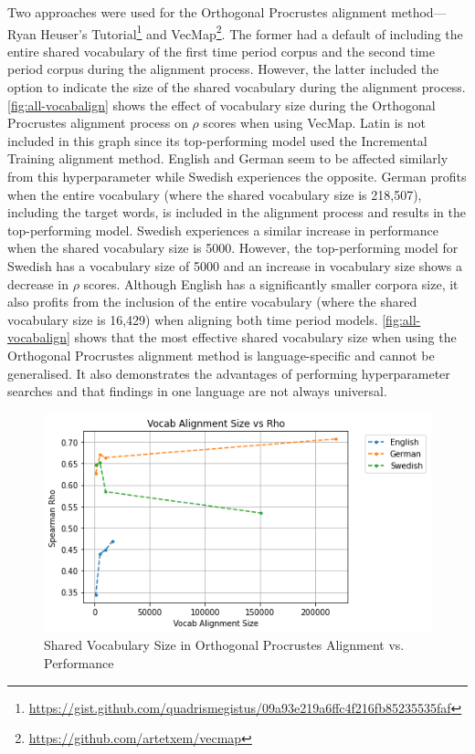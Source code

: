 Two approaches were used for the Orthogonal Procrustes alignment method—Ryan Heuser’s Tutorial\footnote{\url{https://gist.github.com/quadrismegistus/09a93e219a6ffc4f216fb85235535faf}} and VecMap\footnote{\url{https://github.com/artetxem/vecmap}}. The former had a default of including the entire shared vocabulary of the first time period corpus and the second time period corpus during the alignment process. However, the latter included the option to indicate the size of the shared vocabulary during the alignment process. \autoref{fig:all-vocabalign} shows the effect of vocabulary size during the Orthogonal Procrustes alignment process on $\rho$ scores when using VecMap. Latin is not included in this graph since its top-performing model used the Incremental Training alignment method. English and German seem to be affected similarly from this hyperparameter while Swedish experiences the opposite. German profits when the entire vocabulary (where the shared vocabulary size is 218,507), including the target words, is included in the alignment process and results in the top-performing model. Swedish experiences a similar increase in performance when the shared vocabulary size is 5000. However, the top-performing model for Swedish has a vocabulary size of 5000 and an increase in vocabulary size shows a decrease in $\rho$ scores. Although English has a significantly smaller corpora size, it also profits from the inclusion of the entire vocabulary (where the shared vocabulary size is 16,429) when aligning both time period models. \autoref{fig:all-vocabalign} shows that the most effective shared vocabulary size when using the Orthogonal Procrustes alignment method is language-specific and cannot be generalised. It also demonstrates the advantages of performing hyperparameter searches and that findings in one language are not always universal.

\begin{figure}[h]
  \centering
  \includegraphics[width=.8\linewidth]{sections/figures/vocabalignment_all.png}
  \caption{Shared Vocabulary Size in Orthogonal Procrustes Alignment vs. Performance}
  \label{fig:all-vocabalign}
\end{figure}

